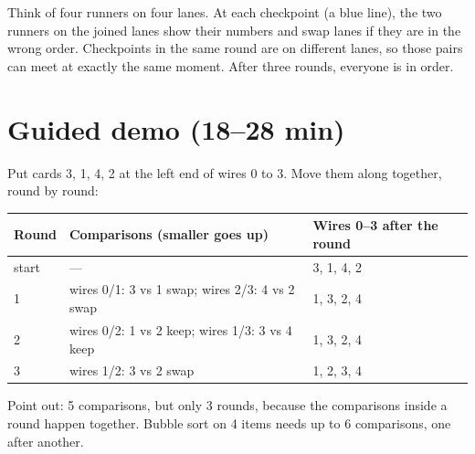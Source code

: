 \begin{center}
\end{center}

\begin{analogy}
Think of four runners on four lanes. At each checkpoint (a blue line), the two runners on the joined lanes show their numbers and swap lanes if they are in the wrong order. Checkpoints in the same round are on different lanes, so those pairs can meet at exactly the same moment. After three rounds, everyone is in order.
\end{analogy}

\section{Guided demo (18--28 min)}
\begin{workedexample}
Put cards 3, 1, 4, 2 at the left end of wires 0 to 3. Move them along together, round by round:
\begin{center}
\begin{tabular}{@{}p{1.3cm}p{7.6cm}p{4.4cm}@{}}
\toprule
\textbf{Round} & \textbf{Comparisons (smaller goes up)} & \textbf{Wires 0--3 after the round} \\ \midrule
start & --- & 3, 1, 4, 2 \\
1 & wires 0/1: 3 vs 1 swap; wires 2/3: 4 vs 2 swap & 1, 3, 2, 4 \\
2 & wires 0/2: 1 vs 2 keep; wires 1/3: 3 vs 4 keep & 1, 3, 2, 4 \\
3 & wires 1/2: 3 vs 2 swap & 1, 2, 3, 4 \\
\bottomrule
\end{tabular}
\end{center}
Point out: 5 comparisons, but only 3 rounds, because the comparisons inside a round happen together. Bubble sort on 4 items needs up to 6 comparisons, one after another.
\end{workedexample}

